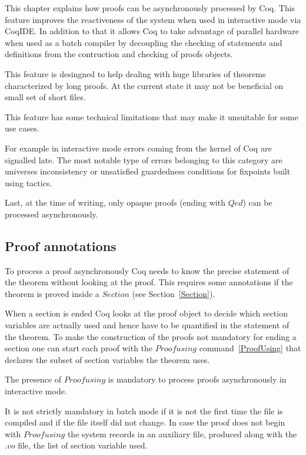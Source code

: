 
\label{pralitp}

This chapter explains how proofs can be asynchronously processed by Coq.
This feature improves the reactiveness of the system when used in interactive
mode via CoqIDE.  In addition to that it allows Coq to take advantage of
parallel hardware when used as a batch compiler by decoupling the checking
of statements and definitions from the contruction and checking of proofs
objects.

This feature is desingned to help dealing with huge libraries of theorems
characterized by long proofs.  At the current state it may not be beneficial
on small set of short files.

This feature has some technical limitations that may make it unsuitable for
some use cases.

For example in interactive mode errors coming from the kernel of Coq are
signalled late.  The most notable type of errors belonging to this category are
universes inconsistency or unsatisfied guardedness conditions for fixpoints
built using tactics.

Last, at the time of writing, only opaque proofs (ending with $Qed$) can be
processed asynchronously.

\subsection{Proof annotations}

To process a proof asynchronously Coq needs to know the precise statement
of the theorem without looking at the proof.  This requires some annotations
if the theorem is proved inside a $Section$ (see Section~\ref{Section}).

When a section is ended Coq looks at the proof object to decide which
section variables are actually used and hence have to be quantified in the
statement of the theorem.  To make the construction of the proofs not
mandatory for ending a section one can start each proof with the
$Proof using$ command~\ref{ProofUsing} that declares the subset of section
variables the theorem uses.

The presence of $Proof using$ is mandatory to process proofs asynchronously
in interactive mode.

It is not strictly mandatory in batch mode if it is not the first time the
file is compiled and if the file itself did not change.  In case the
proof does not begin with $Proof using$ the system records in an auxiliary
file, produced along with the $.vo$ file, the list of section variable used.


